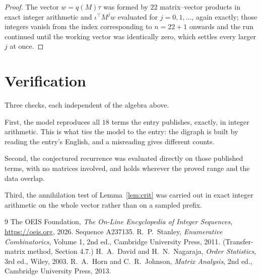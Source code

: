 \documentclass[11pt,a4paper]{article}
\theoremstyle{plain}
\theoremstyle{definition}
\begin{document}
\begin{proof}
The vector $w=q(M)\tau$ was formed by $22$ matrix--vector products in exact integer
arithmetic and $\iota^{\!\top}M^{j}w$ evaluated for $j=0,1,\dots$, again exactly; those
integers vanish from the index corresponding to $n=22+1$ onwards and the run continued
until the working vector was identically zero, which settles every larger $j$ at once.
\end{proof}

\section{Verification}

Three checks, each independent of the algebra above.

First, the model reproduces all $18$ terms the entry publishes, exactly, in integer
arithmetic. This is what ties the model to the entry: the digraph is built by reading the
entry's English, and a misreading gives different counts.

Second, the conjectured recurrence was evaluated directly on those published terms, with no
matrices involved, and holds wherever the proved range and the data overlap.

Third, the annihilation test of Lemma~\ref{lem:crit} was carried out in exact integer
arithmetic on the whole vector rather than on a sampled prefix.

\begin{thebibliography}{9}
 The OEIS Foundation, \emph{The On-Line Encyclopedia of Integer
Sequences}, \url{https://oeis.org}, 2026. Sequence A237135.
 R.~P.~Stanley, \emph{Enumerative Combinatorics}, Volume 1, 2nd ed.,
Cambridge University Press, 2011. (Transfer-matrix method, Section 4.7.)
 H.~A.~David and H.~N.~Nagaraja, \emph{Order Statistics}, 3rd ed., Wiley,
2003.
 R.~A.~Horn and C.~R.~Johnson, \emph{Matrix Analysis}, 2nd ed., Cambridge
University Press, 2013.
\end{thebibliography}
\end{document}
